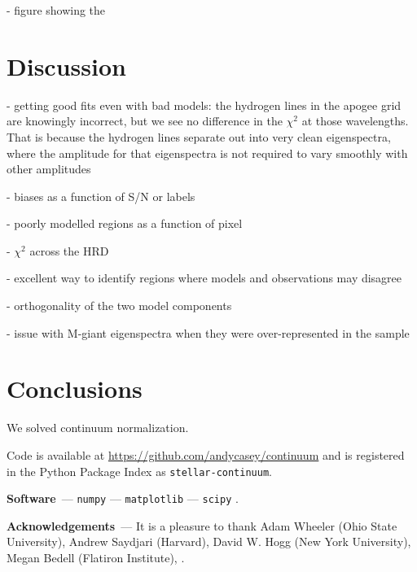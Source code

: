 \documentclass[modern]{aastex631}
\renewcommand{\paragraph}[1]{\medskip\par\noindent\textbf{#1}~---}
\begin{document}
- figure showing the 

\section{Discussion}\label{sec:discussion}

- getting good fits even with bad models: the hydrogen lines in the apogee grid are knowingly incorrect, but we see no difference in the $\chi^2$ at those wavelengths. That is because the hydrogen lines separate out into very clean eigenspectra, where the amplitude for that eigenspectra is not required to vary smoothly with other amplitudes

- biases as a function of S/N or labels

- poorly modelled regions as a function of pixel

- $\chi^2$ across the HRD

- excellent way to identify regions where models and observations may disagree

- orthogonality of the two model components

- issue with M-giant eigenspectra when they were over-represented in the sample


\section{Conclusions}\label{sec:conclusions}

We solved continuum normalization.


Code is available at \url{https://github.com/andycasey/continuum} and is registered in the Python Package Index as \texttt{stellar-continuum}. 

\paragraph{Software}
\texttt{numpy} \citep{numpy} ---
\texttt{matplotlib} \citep{matplotlib} ---
\texttt{scipy} \citep{scipy}.

\paragraph{Acknowledgements}
It is a pleasure to thank
    Adam Wheeler (Ohio State University),
    Andrew Saydjari (Harvard),
    David W. Hogg (New York University),
    Megan Bedell (Flatiron Institute),
.

%
\end{document}
